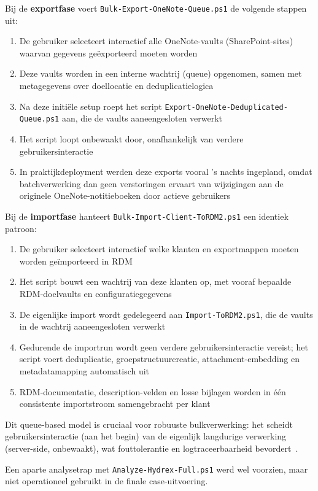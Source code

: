 Bij de \textbf{exportfase} voert \texttt{Bulk-Export-OneNote-Queue.ps1} de volgende stappen uit:
\begin{enumerate}
    \item De gebruiker selecteert interactief alle OneNote-vaults (SharePoint-sites) waarvan gegevens geëxporteerd moeten worden
    \item Deze vaults worden in een interne wachtrij (queue) opgenomen, samen met metagegevens over doellocatie en deduplicatielogica
    \item Na deze initiële setup roept het script \texttt{Export-OneNote-Deduplicated-Queue.ps1} aan, die de vaults aaneengesloten verwerkt
    \item Het script loopt onbewaakt door, onafhankelijk van verdere gebruikersinteractie
    \item In praktijkdeployment werden deze exports vooral 's nachts ingepland, omdat batchverwerking dan geen verstoringen ervaart van wijzigingen aan de originele OneNote-notitieboeken door actieve gebruikers
\end{enumerate}

Bij de \textbf{importfase} hanteert \texttt{Bulk-Import-Client-ToRDM2.ps1} een identiek patroon:
\begin{enumerate}
    \item De gebruiker selecteert interactief welke klanten en exportmappen moeten worden geïmporteerd in RDM
    \item Het script bouwt een wachtrij van deze klanten op, met vooraf bepaalde RDM-doelvaults en configuratiegegevens
    \item De eigenlijke import wordt gedelegeerd aan \texttt{Import-ToRDM2.ps1}, die de vaults in de wachtrij aaneengesloten verwerkt
    \item Gedurende de importrun wordt geen verdere gebruikersinteractie vereist; het script voert deduplicatie, groepstructuurcreatie, attachment-embedding en metadatamapping automatisch uit
    \item RDM-documentatie, description-velden en losse bijlagen worden in één consistente importstroom samengebracht per klant
\end{enumerate}

Dit queue-based model is cruciaal voor robuuste bulkverwerking: het scheidt gebruikersinteractie (aan het begin) van de eigenlijk langdurige verwerking (server-side, onbewaakt), wat fouttolerantie en logtraceerbaarheid bevordert~\autocite{fowler2002patterns}. 

Een aparte analysetrap met \texttt{Analyze-Hydrex-Full.ps1} werd wel voorzien, maar niet operationeel gebruikt in de finale case-uitvoering.

